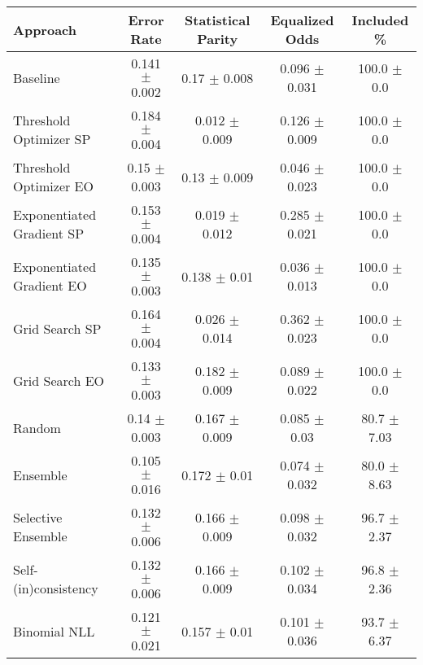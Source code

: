\begin{tabular} {lcccc}
\toprule
\textbf{Approach} & \textbf{Error Rate} & \textbf{Statistical Parity} & \textbf{Equalized Odds} & \textbf{Included \%} \\ \midrule
Baseline & 0.141 $\pm$ 0.002 & 0.17 $\pm$ 0.008 & 0.096 $\pm$ 0.031 & \cellcolor{gold!30}100.0 $\pm$ 0.0 \\ 
Threshold Optimizer SP & 0.184 $\pm$ 0.004 & \cellcolor{gold!30}0.012 $\pm$ 0.009 & 0.126 $\pm$ 0.009 & \cellcolor{gold!30}100.0 $\pm$ 0.0 \\ 
Threshold Optimizer EO & 0.15 $\pm$ 0.003 & 0.13 $\pm$ 0.009 & \cellcolor{silver!30}0.046 $\pm$ 0.023 & \cellcolor{gold!30}100.0 $\pm$ 0.0 \\ 
Exponentiated Gradient SP & 0.153 $\pm$ 0.004 & \cellcolor{silver!30}0.019 $\pm$ 0.012 & 0.285 $\pm$ 0.021 & \cellcolor{gold!30}100.0 $\pm$ 0.0 \\ 
Exponentiated Gradient EO & 0.135 $\pm$ 0.003 & 0.138 $\pm$ 0.01 & \cellcolor{gold!30}0.036 $\pm$ 0.013 & \cellcolor{gold!30}100.0 $\pm$ 0.0 \\ 
Grid Search SP & 0.164 $\pm$ 0.004 & \cellcolor{bronze!30}0.026 $\pm$ 0.014 & 0.362 $\pm$ 0.023 & \cellcolor{gold!30}100.0 $\pm$ 0.0 \\ 
Grid Search EO & 0.133 $\pm$ 0.003 & 0.182 $\pm$ 0.009 & 0.089 $\pm$ 0.022 & \cellcolor{gold!30}100.0 $\pm$ 0.0 \\ 
Random & 0.14 $\pm$ 0.003 & 0.167 $\pm$ 0.009 & 0.085 $\pm$ 0.03 & 80.7 $\pm$ 7.03 \\ 
Ensemble & \cellcolor{gold!30}0.105 $\pm$ 0.016 & 0.172 $\pm$ 0.01 & \cellcolor{bronze!30}0.074 $\pm$ 0.032 & 80.0 $\pm$ 8.63 \\ 
Selective Ensemble & \cellcolor{bronze!30}0.132 $\pm$ 0.006 & 0.166 $\pm$ 0.009 & 0.098 $\pm$ 0.032 & 96.7 $\pm$ 2.37 \\ 
Self-(in)consistency & \cellcolor{bronze!30}0.132 $\pm$ 0.006 & 0.166 $\pm$ 0.009 & 0.102 $\pm$ 0.034 & 96.8 $\pm$ 2.36 \\ 
Binomial NLL & \cellcolor{silver!30}0.121 $\pm$ 0.021 & 0.157 $\pm$ 0.01 & 0.101 $\pm$ 0.036 & 93.7 $\pm$ 6.37 \\ 
\bottomrule
\end{tabular}
